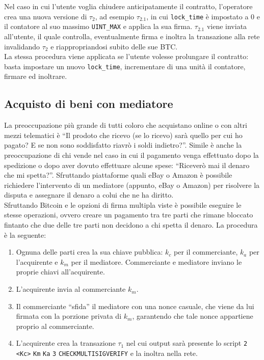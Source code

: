 Nel caso in cui l'utente voglia chiudere anticipatamente il contratto, l'operatore crea una nuova versione di $\tau_2$, ad esempio $\tau_2.1$, in cui \verb|lock_time| è impostato a 0 e il contatore al suo massimo \verb|UINT_MAX| e applica la sua firma. $\tau_2.1$ viene inviata all'utente, il quale controlla, eventualmente firma e inoltra la transazione alla rete invalidando $\tau_2$ e riappropriandosi subito delle sue BTC.\\
La stessa procedura viene applicata se l'utente volesse prolungare il contratto: basta impostare un nuovo \verb|lock_time|, incrementare di una unità il contatore, firmare ed inoltrare.

\subsection{Acquisto di beni con mediatore}

La preoccupazione più grande di tutti coloro che acquistano online o con altri mezzi telematici è ``Il prodoto che ricevo (se lo ricevo) sarà quello per cui ho pagato? E se non sono soddisfatto riavrò i soldi indietro?''. Simile è anche la preoccupazione di chi vende nel caso in cui il pagamento venga effettuato dopo la spedizione o dopo aver dovuto effettuare alcune spese: ``Riceverò mai il denaro che mi spetta?''. Sfruttando piattaforme quali eBay o Amazon è possibile richiedere l'intervento di un mediatore (appunto, eBay o Amazon) per risolvere la disputa e assegnare il denaro a colui che ne ha diritto.\\
Sfruttando Bitcoin e le opzioni di firma multipla viste è possibile eseguire le stesse operazioni, ovvero creare un pagamento tra tre parti che rimane bloccato fintanto che due delle tre parti non decidono a chi spetta il denaro. La procedura è la seguente:
\begin{enumerate}
    \item Ognuna delle parti crea la sua chiave pubblica: $k_c$ per il commerciante, $k_a$ per l'acquirente e $k_m$ per il mediatore. Commerciante e mediatore inviano le proprie chiavi all'acquirente.
    \item L'acquirente invia al commerciante $k_m$.
    \item Il commerciante ``sfida'' il mediatore con una nonce casuale, che viene da lui firmata con la porzione privata di $k_m$, garantendo che tale nonce appartiene proprio al commerciante.
    \item L'acquirente crea la transazione $\tau_1$ nel cui output sarà presente lo script \verb|2| \verb|<Kc>| \verb|Km| \verb|Ka| \verb|3| \verb|CHECKMULTISIGVERIFY| e la inoltra nella rete.
\end{enumerate}

